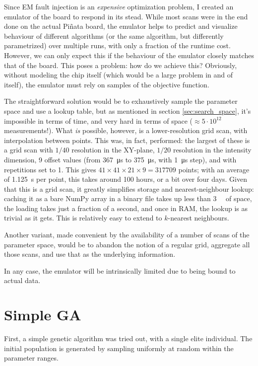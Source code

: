 \documentclass[times, utf8, diplomski]{fer}
\begin{document}
Since EM fault injection is an \emph{expensive} optimization problem, I created
an emulator of the board to respond in its stead. While most scans were in the
end done on the actual Piñata board, the emulator helps to predict and visualize
behaviour of different algorithms (or the same algorithm, but differently
parametrized) over multiple runs, with only a fraction of the runtime cost.
However, we can only expect this if the behaviour of the emulator closely
matches that of the board. This poses a problem: how do we achieve this?
Obviously, without modeling the chip itself (which would be a large problem
in and of itself), the emulator must rely on samples of the objective function.

The straightforward solution would be to exhaustively sample the parameter space
and use a lookup table, but as mentioned in section \ref{sec:search_space}, it's
impossible in terms of time, and very hard in terms of space ($\approx 5 \cdot
10^{12}$ measurements!). What \emph{is} possible, however, is a lower-resolution
grid scan, with interpolation between points. This was, in fact, performed: the
largest of these is a grid scan with $1/40$ resolution in the XY-plane, $1/20$
resolution in the intensity dimension, 9 offset values (from \SI{367}{\micro\second}
to \SI{375}{\micro\second}, with \SI{1}{\micro\second} step), and with repetitions
set to 1. This gives $41 \times 41 \times 21 \times 9 = 317709$ points; with an
average of \SI{1.125}{\second} per point, this takes around 100 hours, or a bit
over four days. Given that this is a grid scan, it greatly simplifies storage
and nearest-neighbour lookup: caching it as a bare NumPy array in a binary file
takes up less than \SI{3}{\mebi\byte} of space, the loading takes just a
fraction of a second, and once in RAM, the lookup is as trivial as it gets.
This is relatively easy to extend to $k$-nearest neighbours.

Another variant, made convenient by the availability of a number of scans of the
parameter space, would be to abandon the notion of a regular grid, aggregate all
those scans, and use that as the underlying information.


In any case, the emulator will be intrinsically limited due to being bound to
actual data.




\section{Simple GA}
First, a simple genetic algorithm was tried out, with a single elite individual.
The initial population is generated by sampling uniformly at random within the
parameter ranges.
\end{document}
